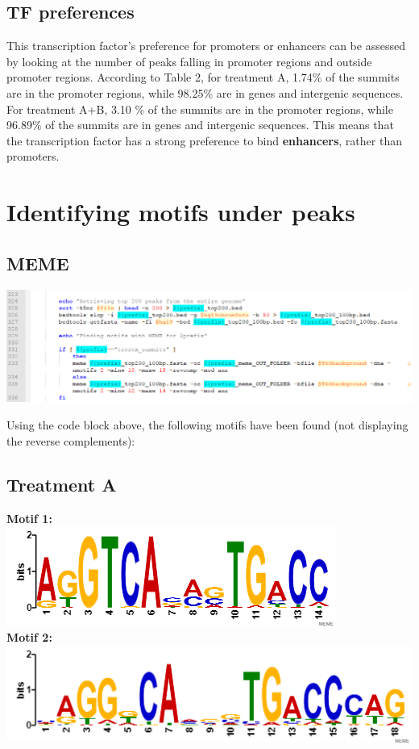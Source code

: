 \documentclass[a4paper,11pt]{article}
\begin{document}
\normalsize
\subsection{TF preferences}
\noindent This transcription factor's preference for promoters or enhancers can be assessed by looking at the number of peaks falling in promoter regions and outside promoter regions. According to Table 2, for treatment A, 1.74\% of the summits are in the promoter regions, while 98.25\% are in genes and intergenic sequences. For treatment A+B, 3.10 \% of the summits are in the promoter regions, while 96.89\% of the summits are in genes and intergenic sequences. This means that the transcription factor has a strong preference to bind \textbf{enhancers}, rather than promoters.

\section{Identifying motifs under peaks}

\subsection{MEME}
\noindent \includegraphics[scale=0.75]{MEME.PNG}

Using the code block above, the following motifs have been found (not displaying the reverse complements):

\subsection*{Treatment A}
\noindent \textbf{Motif 1:} \\
\noindent \includegraphics[scale=0.75]{A_meme1.PNG}\\
\noindent \textbf{Motif 2:} \\
\noindent \includegraphics[scale=0.75]{A_meme2.PNG}\\
\pagebreak
\end{document}
